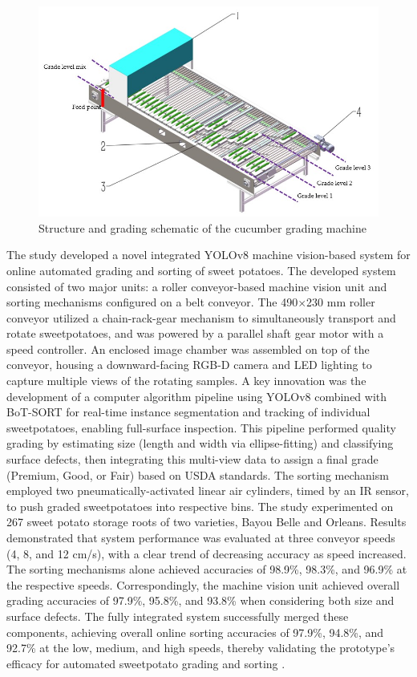 {\begin{figure}[ht]
	\centering
	\includegraphics[width=0.7\linewidth]{figures/Liu2024}
	\caption{Structure and grading schematic of the cucumber grading machine \citep{liu2024design}}
	\label{fig:liu2024}
\end{figure}


The study developed a novel integrated YOLOv8 machine vision-based system for online automated grading and sorting of sweet potatoes. The developed system consisted of two major units: a roller conveyor-based machine vision unit and sorting mechanisms configured on a belt conveyor. The 490$\times$230 mm roller conveyor utilized a chain-rack-gear mechanism to simultaneously transport and rotate sweetpotatoes, and was powered by a parallel shaft gear motor with a speed controller. An enclosed image chamber was assembled on top of the conveyor, housing a downward-facing RGB-D camera and LED lighting to capture multiple views of the rotating samples. A key innovation was the development of a computer algorithm pipeline using YOLOv8 combined with BoT-SORT for real-time instance segmentation and tracking of individual sweetpotatoes, enabling full-surface inspection. This pipeline performed quality grading by estimating size (length and width via ellipse-fitting) and classifying surface defects, then integrating this multi-view data to assign a final grade (Premium, Good, or Fair) based on USDA standards. The sorting mechanism employed two pneumatically-activated linear air cylinders, timed by an IR sensor, to push graded sweetpotatoes into respective bins. The study experimented on 267 sweet potato storage roots of two varieties, Bayou Belle and Orleans. Results demonstrated that system performance was evaluated at three conveyor speeds (4, 8, and 12 cm/s), with a clear trend of decreasing accuracy as speed increased. The sorting mechanisms alone achieved accuracies of 98.9\%, 98.3\%, and 96.9\% at the respective speeds. Correspondingly, the machine vision unit achieved overall grading accuracies of 97.9\%, 95.8\%, and 93.8\% when considering both size and surface defects. The fully integrated system successfully merged these components, achieving overall online sorting accuracies of 97.9\%, 94.8\%, and 92.7\% at the low, medium, and high speeds, thereby validating the prototype’s efficacy for automated sweetpotato grading and sorting \citep{xu2024design}.

}
